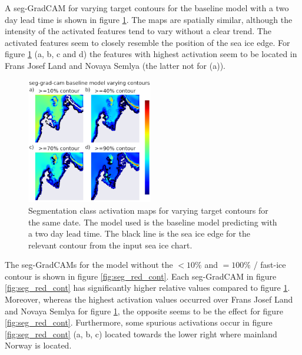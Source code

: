 \documentclass[../main/thesis.tex]{subfiles}
\begin{document}
A seg-GradCAM for varying target contours for the baseline model with a two day lead time is shown in figure \ref{fig:seg_base_cont}. The maps are spatially similar, although the intensity of the activated features tend to vary without a clear trend. The activated features seem to closely resemble the position of the sea ice edge. For figure \ref{fig:seg_base_cont} (a, b, c and d) the features with highest activation seem to be located in Frans Josef Land and Novaya Semlya (the latter not for (a)). 

\begin{figure}
    \centering
    \includegraphics[width=0.49\textwidth]{baseline_contours}
    \caption{\label{fig:seg_base_cont}Segmentation class activation maps for varying target contours for the same date. The model used is the baseline model predicting with a two day lead time. The black line is the sea ice edge for the relevant contour from the input sea ice chart.}
\end{figure}

The seg-GradCAMs for the model without the $<10\%$ and $=100\%$ / fast-ice contour is shown in figure \ref{fig:seg_red_cont}. Each seg-GradCAM in figure \ref{fig:seg_red_cont} has significantly higher relative values compared to figure \ref{fig:seg_base_cont}. Moreover, whereas the highest activation values occurred over Frans Josef Land and Novaya Semlya for figure \ref{fig:seg_base_cont}, the opposite seems to be the effect for figure \ref{fig:seg_red_cont}. Furthermore, some spurious activations occur in figure \ref{fig:seg_red_cont} (a, b, c) located towards the lower right where mainland Norway is located.
\end{document}
